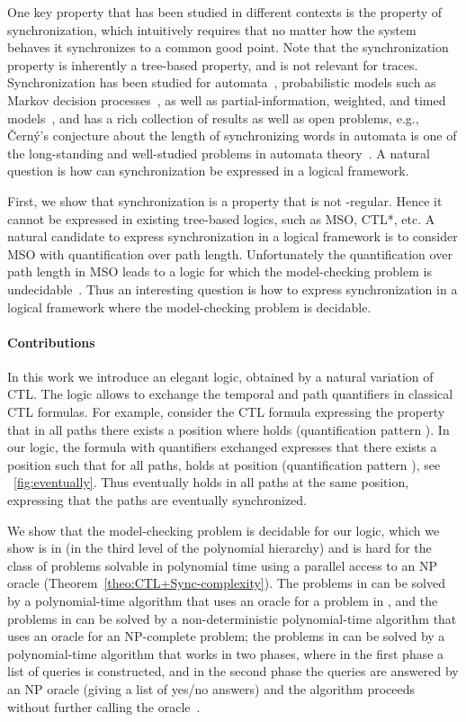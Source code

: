 \documentclass{article}
\begin{document}
One key property that has been studied in different contexts is the property of 
synchronization, which intuitively requires that no matter how the system behaves 
it synchronizes to a common good point. 
Note that the synchronization property is inherently a tree-based property, 
and is not relevant for traces. 
Synchronization has been studied for automata~\cite{Volkov08,CMS16}, 
probabilistic models such as Markov decision processes~\cite{DMS14a,DMS14b}, 
as well as partial-information, weighted, and timed models~\cite{LLS14,KLLS15,DJLMS14}, 
and has a rich collection of results as well as open problems, e.g., \v{C}ern\'{y}'s 
conjecture about the length of synchronizing words in automata is one of the long-standing 
and well-studied problems in automata theory~\cite{Cer64,Volkov08}. 
A natural question is how can synchronization be expressed in a logical framework.

First, we show that synchronization is a property that is not -regular. 
Hence it cannot be expressed in existing tree-based logics, such as MSO, CTL*, etc. 
A natural candidate to express synchronization in a logical framework is to consider 
MSO with quantification over path length. Unfortunately the quantification over path length in MSO
leads to a logic for which the model-checking problem is undecidable~\cite[Theorem 11.6]{Thomas90}. 
Thus an interesting question is how to express synchronization in a logical framework 
where the model-checking problem is decidable. 

\paragraph*{Contributions}
In this work we introduce an elegant logic, obtained by a natural variation of CTL. 
The logic allows to exchange the temporal and path quantifiers in classical CTL formulas. 
For example, consider the CTL formula  expressing the property 
that in all paths there exists a position where  holds (quantification pattern ). 
In our logic, the formula  with quantifiers exchanged expresses that 
there exists a position  such that for all paths,  holds at position  (quantification pattern ),
see \figurename~\ref{fig:eventually}.
Thus  eventually holds in all paths at the same position, expressing that
the paths are eventually synchronized. 

We show that the model-checking problem is decidable for our logic,
which we show is in  (in the third 
level of the polynomial hierarchy) and is hard
for the class  of problems solvable in polynomial time using a
parallel access to an NP oracle (Theorem~\ref{theo:CTL+Sync-complexity}).
The problems in  can be solved by a 
polynomial-time algorithm that uses an oracle for a problem in ,
and the problems in  can be solved by a non-deterministic
polynomial-time algorithm that uses an oracle for an NP-complete problem;
the problems in  can be solved by a 
polynomial-time algorithm that works in two phases, where in the first phase
a list of queries is constructed, and in the second phase the queries are
answered by an NP oracle (giving a list of yes/no answers) and the algorithm
proceeds without further calling the oracle~\cite{Wagner87,Spako05}. 
\end{document}
